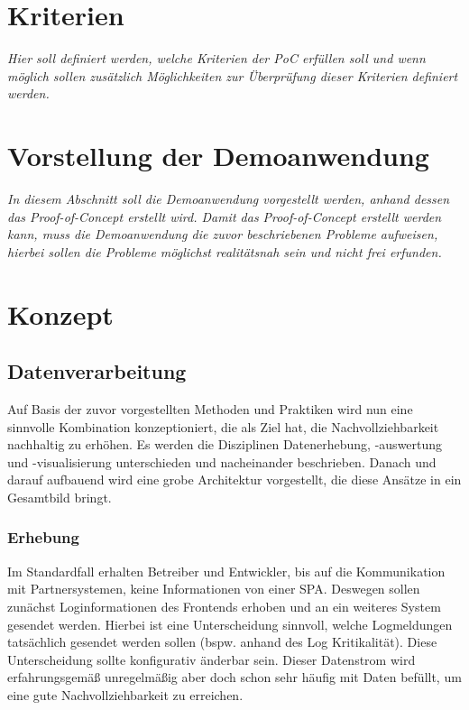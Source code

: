 	
\section{Kriterien}

	\textit{Hier soll definiert werden, welche Kriterien der PoC erfüllen soll und wenn möglich sollen zusätzlich Möglichkeiten zur Überprüfung dieser Kriterien definiert werden.}
	
\section{Vorstellung der Demoanwendung}

	\textit{In diesem Abschnitt soll die Demoanwendung vorgestellt werden, anhand dessen das Proof-of-Concept erstellt wird. Damit das Proof-of-Concept erstellt werden kann, muss die Demoanwendung die zuvor beschriebenen Probleme aufweisen, hierbei sollen die Probleme möglichst realitätsnah sein und nicht frei erfunden.}
	
\section{Konzept}
	
	\subsection{Datenverarbeitung}

	Auf Basis der zuvor vorgestellten Methoden und Praktiken wird nun eine sinnvolle Kombination konzeptioniert, die als Ziel hat, die Nachvollziehbarkeit nachhaltig zu erhöhen. Es werden die Disziplinen Datenerhebung, -auswertung und -visualisierung unterschieden und nacheinander beschrieben. Danach und darauf aufbauend wird eine grobe Architektur vorgestellt, die diese Ansätze in ein Gesamtbild bringt.
		
	\subsubsection{Erhebung}
		
	Im Standardfall erhalten Betreiber und Entwickler, bis auf die Kommunikation mit Partnersystemen, keine Informationen von einer SPA. Deswegen sollen zunächst Loginformationen des Frontends erhoben und an ein weiteres System gesendet werden. Hierbei ist eine Unterscheidung sinnvoll, welche Logmeldungen tatsächlich gesendet werden sollen (bspw. anhand des Log Kritikalität). Diese Unterscheidung sollte konfigurativ änderbar sein. Dieser Datenstrom wird erfahrungsgemäß unregelmäßig aber doch schon sehr häufig mit Daten befüllt, um eine gute Nachvollziehbarkeit zu erreichen.
		
